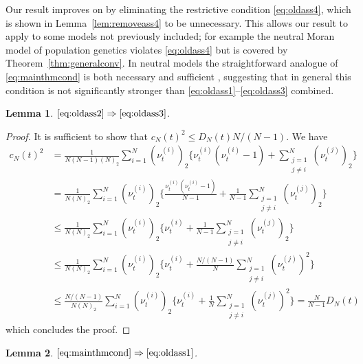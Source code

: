 \documentclass{article} %
\newtheorem{lemma}{Lemma}
\theoremstyle{definition}
\newcommand{\1}[1]{\mathbbm{1}_{\{#1\}}}
\begin{document}
Our result improves on \cite{koskela2018} by eliminating the restrictive condition \eqref{eq:oldass4}, which is shown in Lemma~\ref{lem:removeass4} to be unnecessary. This allows our result to apply to some models not previously included; for example the neutral Moran model of population genetics violates \eqref{eq:oldass4} but is covered by Theorem~\ref{thm:generalconv}. 
In neutral models the straightforward analogue of \eqref{eq:mainthmcond} is both necessary and sufficient \cite[Theorem 5.4]{mohle2003}, suggesting that in general this condition is not significantly stronger than \eqref{eq:oldass1}--\eqref{eq:oldass3} combined.

\begin{lemma} \label{lem:removeass3}
$\eqref{eq:oldass2} \Rightarrow \eqref{eq:oldass3}$.
\end{lemma}

\begin{proof}
It is sufficient to show that $c_N( t )^2 \leq D_N( t ) N/(N-1)$.
We have
\begin{align*}
c_N( t )^2 &= \frac{ 1 }{ N ( N - 1 ) ( N )_2 } \sum_{ i = 1 }^N ( \nu_t^{(i)})_2 \Bigg\{ \nu_t^{(i)} ( \nu_t^{(i)} - 1 ) + \sum_{\substack{j=1\\ j \neq i }}^N ( \nu_t^{(j)} )_2 \Bigg\} \\
&= \frac{ 1 }{ N ( N )_2 } \sum_{ i = 1 }^N ( \nu_t^{(i)} )_2 \Bigg\{ \frac{ \nu_t^{(i)} ( \nu_t^{(i)} - 1 ) }{ N - 1 } + \frac{ 1 }{ N - 1 } \sum_{\substack{j=1\\ j \neq i }}^N ( \nu_t^{(j)} )_2 \Bigg\} \\
&\leq \frac{ 1 }{ N ( N )_2 } \sum_{ i = 1 }^N ( \nu_t^{(i)})_2 \Bigg\{ \nu_t^{(i)} + \frac{ 1 }{ N - 1 } \sum_{\substack{j=1\\ j \neq i }}^N ( \nu_t^{(j)} )_2 \Bigg\} \\
&\leq \frac{ 1 }{ N ( N )_2 } \sum_{ i = 1 }^N ( \nu_t^{(i)})_2 \Bigg\{ \nu_t^{(i)} + \frac{ N / ( N - 1 ) }{ N } \sum_{\substack{j=1\\ j \neq i }}^N ( \nu_t^{(j)} )^2 \Bigg\} \\
&\leq \frac{ N / ( N - 1 ) }{ N ( N )_2 } \sum_{ i = 1 }^N ( \nu_t^{(i)})_2 \Bigg\{ \nu_t^{(i)} + \frac{ 1 }{ N } \sum_{\substack{j=1\\ j \neq i }}^N ( \nu_t^{(j)} )^2 \Bigg\} = \frac{ N }{ N - 1 } D_N( t )
\end{align*}
which concludes the proof.
\end{proof}

\begin{lemma} \label{lem:removeass1}
$\eqref{eq:mainthmcond} \Rightarrow \eqref{eq:oldass1}$.
\end{lemma}
\end{document}
